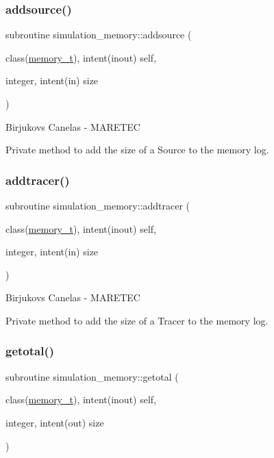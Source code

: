 \subsubsection{\texorpdfstring{addsource()}{addsource()}}
{\footnotesize\ttfamily subroutine simulation\+\_\+memory\+::addsource (\begin{DoxyParamCaption}\item[{class(\mbox{\hyperlink{structsimulation__memory_1_1memory__t}{memory\+\_\+t}}), intent(inout)}]{self,  }\item[{integer, intent(in)}]{size }\end{DoxyParamCaption})\hspace{0.3cm}{\ttfamily [private]}}



Birjukovs Canelas -\/ M\+A\+R\+E\+T\+EC 

Private method to add the size of a Source to the memory log. \mbox{\label{namespacesimulation__memory_a4d6c8bd027a99cb6c7f9ad2eb55c744f}} 
\subsubsection{\texorpdfstring{addtracer()}{addtracer()}}
{\footnotesize\ttfamily subroutine simulation\+\_\+memory\+::addtracer (\begin{DoxyParamCaption}\item[{class(\mbox{\hyperlink{structsimulation__memory_1_1memory__t}{memory\+\_\+t}}), intent(inout)}]{self,  }\item[{integer, intent(in)}]{size }\end{DoxyParamCaption})\hspace{0.3cm}{\ttfamily [private]}}



Birjukovs Canelas -\/ M\+A\+R\+E\+T\+EC 

Private method to add the size of a Tracer to the memory log. \mbox{\label{namespacesimulation__memory_a8589522c4e28cf60741a5439477cdb31}} 
\subsubsection{\texorpdfstring{getotal()}{getotal()}}
{\footnotesize\ttfamily subroutine simulation\+\_\+memory\+::getotal (\begin{DoxyParamCaption}\item[{class(\mbox{\hyperlink{structsimulation__memory_1_1memory__t}{memory\+\_\+t}}), intent(inout)}]{self,  }\item[{integer, intent(out)}]{size }\end{DoxyParamCaption})\hspace{0.3cm}{\ttfamily [private]}}




